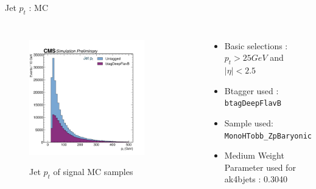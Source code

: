 \documentclass[10pt,xcolor=dvipsnames,aspectratio=169]{beamer}
\begin{document}
    
   \begin{frame}[fragile]{Jet $p_t$ : MC} 
    \begin{columns}
    \begin{figure} 
    \centering 
     \includegraphics[width=0.8\textwidth]{../Archive/KinemPlots/JetsMC.png }
    \label{JetMC} 
    \caption{Jet $p_t$ of signal MC samples}
    \end{figure} 
    \begin{itemize} 
    \raggedright 
    \small
    \item Basic selections : $p_t > 25 GeV $ and $|\eta | < 2.5 $
    \item {Btagger used : \texttt{btagDeepFlavB}} 
    \item {Sample used: \texttt{MonoHTobb\_ZpBaryonic}} 
    \item Medium Weight Parameter used for ak4bjets : 0.3040  
    \end{itemize}
    \end{columns} 
    \end{frame} 
    
\end{document}
